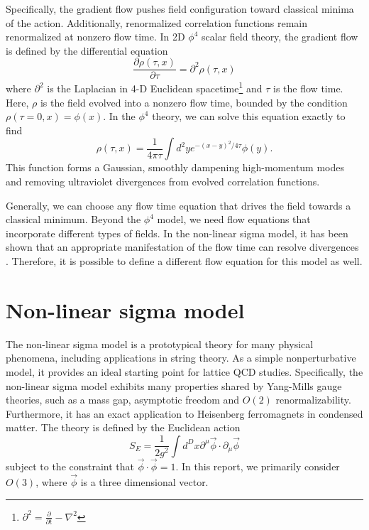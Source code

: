 \documentclass[12pt]{report}
\begin{document}
Specifically, the gradient flow pushes field configuration toward classical minima of the action. Additionally, renormalized correlation functions remain renormalized at nonzero flow time.\cite{luscher2013} In 2D $\phi^4$ scalar field theory, the gradient flow is defined by the differential equation 
\begin{equation}
    \frac{\partial \rho(\tau, x)}{\partial \tau} = \partial^2 \rho(\tau,x)
\end{equation}
where $\partial^2$ is the Laplacian in 4-D Euclidean spacetime\footnote{$\partial^2 = \frac{\partial}{\partial t} - \nabla^2$} and $\tau$ is the flow time. Here, $\rho$ is the field evolved into a nonzero flow time, bounded by the condition $\rho(\tau=0,x) = \phi(x)$. In the $\phi^4$ theory, we can solve this equation exactly to find
\begin{equation}
    \rho(\tau, x) = \frac{1}{4 \pi \tau} \int d^2 y e^{-(x-y)^2/4\tau} \phi(y).
\end{equation}
This function forms a Gaussian, smoothly dampening high-momentum modes and removing ultraviolet divergences from evolved correlation functions.\cite{makino2015a}

Generally, we can choose any flow time equation that drives the field towards a classical minimum. Beyond the $\phi^4$ model, we need flow equations that incorporate different types of fields. In the non-linear sigma model, it has been shown that an appropriate manifestation of the flow time can resolve divergences \cite{makino2015a}. Therefore, it is possible to define a different flow equation for this model as well.


\section{Non-linear sigma model}

The non-linear sigma model is a prototypical theory for many physical phenomena, including applications in string theory. As a simple nonperturbative model, it provides an ideal starting point for lattice QCD studies. Specifically, the non-linear sigma model exhibits many properties shared by Yang-Mills gauge theories, such as a mass gap, asymptotic freedom and $O(2)$ renormalizability. Furthermore, it has an exact application to Heisenberg ferromagnets in condensed matter. The theory is defined by the Euclidean action 
\begin{equation}
    S_E = \frac{1}{2g^2} \int d^Dx \partial^\mu \vec\phi \cdot \partial_\mu \vec\phi
\end{equation}
subject to the constraint that $\vec\phi\cdot\vec\phi = 1$. In this report, we primarily consider $O(3)$, where $\vec\phi$ is a three dimensional vector.
\end{document}
